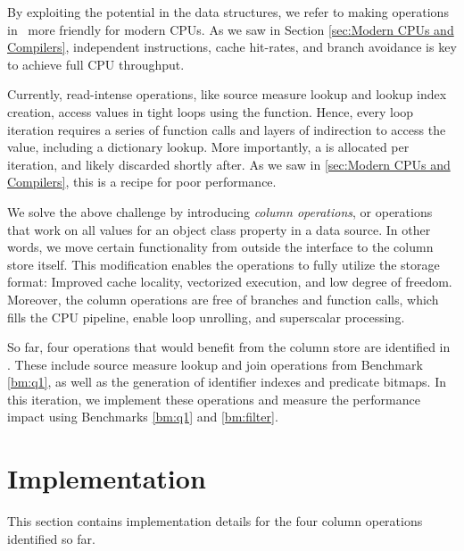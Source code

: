 By exploiting the potential in the data structures, we refer to making operations in \gap~more friendly for modern CPUs. As we saw in Section \ref{sec:Modern CPUs and Compilers}, independent instructions, cache hit-rates, and branch avoidance is key to achieve full CPU throughput. 

Currently, read-intense operations, like source measure lookup and lookup index creation, access values in tight loops using the  function. Hence, every loop iteration requires a series of function calls and layers of indirection to access the value, including a dictionary lookup. More importantly, a  is allocated per iteration, and likely discarded shortly after. As we saw in \ref{sec:Modern CPUs and Compilers}, this is a recipe for poor performance.

We solve the above challenge by introducing \textit{column operations}, or operations that work on all values for an object class property in a data source. In other words, we move certain functionality from outside the  interface to the column store itself. This modification enables the operations to fully utilize the storage format: Improved cache locality, vectorized execution, and low degree of freedom. Moreover, the column operations are free of branches and function calls, which fills the CPU pipeline, enable loop unrolling, and superscalar processing.

So far, four operations that would benefit from the column store are identified in \gap. These include source measure lookup and join operations from Benchmark \ref{bm:q1}, as well as the generation of identifier indexes and predicate bitmaps. In this iteration, we implement these operations and measure the performance impact using Benchmarks \ref{bm:q1} and \ref{bm:filter}.





\section{Implementation}
\label{sec:Implementation}
This section contains implementation details for the four column operations identified so far.

